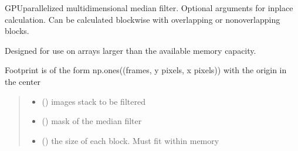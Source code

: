 \documentclass[letterpaper,10pt,english]{sphinxmanual}
\begin{document}
\begin{fulllineitems}
\label{\detokenize{CalSciPy.image_processing:CalSciPy.image_processing.median_filter}}
\pysigstartsignatures
{}
\pysigstopsignatures
\sphinxAtStartPar
GPU\sphinxhyphen{}parallelized multidimensional median filter. Optional arguments for in\sphinxhyphen{}place calculation. Can be calculated
blockwise with overlapping or non\sphinxhyphen{}overlapping blocks.

\sphinxAtStartPar
Designed for use on arrays larger than the available memory capacity.

\sphinxAtStartPar
Footprint is of the form np.ones((frames, y pixels, x pixels)) with the origin in the center
\begin{quote}\begin{description}
\begin{itemize}
\item {} 
\sphinxAtStartPar
{} () \textendash{} images stack to be filtered

\item {} 
\sphinxAtStartPar
{} (\sphinxstyleliteralemphasis{\sphinxupquote{(}}\sphinxstyleliteralemphasis{\sphinxupquote{(}}\sphinxstyleliteralemphasis{\sphinxupquote{, }}\sphinxstyleliteralemphasis{\sphinxupquote{, }}\sphinxstyleliteralemphasis{\sphinxupquote{)}}\sphinxstyleliteralemphasis{\sphinxupquote{)}}) \textendash{} mask of the median filter

\item {} 
\sphinxAtStartPar
{} () \textendash{} the size of each block. Must fit within memory


\end{itemize}
\end{description}
\end{quote}
\end{fulllineitems}
\end{document}
